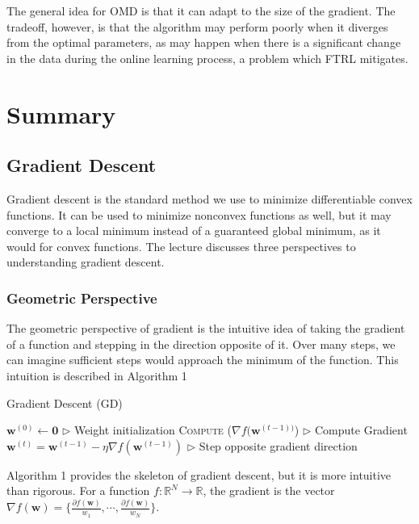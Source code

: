 \documentclass[11pt]{article}
\begin{document}
The general idea for OMD is that it can adapt to the size of the gradient. The tradeoff, however, is that the algorithm may perform poorly when it diverges from the optimal parameters, as may happen when there is a significant change in the data during the online learning process, a problem which FTRL mitigates. 



\section{Summary}
\subsection{Gradient Descent}
\normalfont
Gradient descent is the standard method we use to minimize differentiable convex functions. It can be used to minimize nonconvex functions as well, but it may converge to a local minimum instead of a guaranteed global minimum, as it would for convex functions. The lecture discusses three perspectives to understanding gradient descent.

\subsubsection{Geometric Perspective}
The geometric perspective of gradient is the intuitive idea of taking the gradient of a function and stepping in the direction opposite of it. Over many steps, we can imagine sufficient steps would approach the minimum of the function. This intuition is described in Algorithm 1


\begin{algorithm}[H]
\caption{Gradient Descent (GD)}
\label{algo:gd}
\begin{algorithmic}[1]
\STATE $\textbf{w}^{(0)} \leftarrow \textbf{0}$ \hfill $\triangleright$ Weight initialization
\STATE \textsc{Compute} ($\nabla f(\textbf{w}^{(t-1))}$) \hfill $\triangleright$ Compute Gradient
\STATE $\textbf{w}^{(t)} = \textbf{w}^{(t-1)} - \eta \nabla f(\textbf{w}^{(t-1)})$ \hfill $\triangleright$
Step opposite gradient direction
\ENDFOR
\end{algorithmic}
\end{algorithm}

Algorithm 1 provides the skeleton of gradient descent, but it is more intuitive than rigorous. For a function $f:\mathbb{R}^N \rightarrow \mathbb{R}$, the gradient is the vector $\nabla f(\textbf{w}) = \{ \frac{\partial f(\textbf{w})}{w_1}, \cdots, \frac{\partial f(\textbf{w})}{w_N} \}$.
\end{document}
